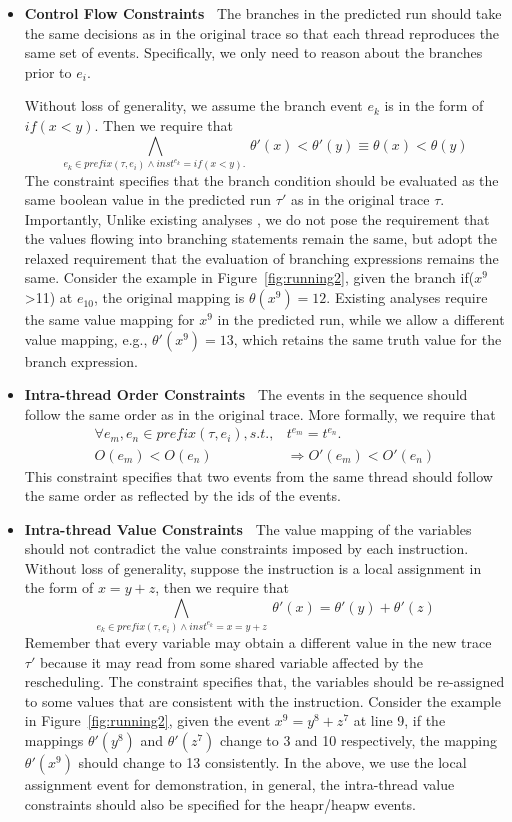 \begin{itemize}
\item {\bf Control Flow Constraints\ } The branches in the predicted run should take the same decisions as in the original trace so that each thread reproduces the same set of events.  Specifically, we only need to reason about the branches prior to $e_i$.

Without loss of generality, we assume the branch event $e_k$ is in the form of $if(x<y)$. Then  we require that 
$$
\bigwedge_{e_k \in prefix(\tau,e_i) \wedge  inst^{e_k}=if(x<y).\ }  \theta'(x)<\theta'(y) 	\equiv \theta(x)<\theta(y)
$$ 
The constraint specifies that the branch condition should be evaluated as the same boolean value in the predicted run $\tau'$ as in the original trace $\tau$.
 Importantly, Unlike existing analyses \cite{yannis,pldi14}, we do not pose the requirement that the values flowing into branching statements remain the same, but adopt the relaxed requirement that the evaluation of branching expressions remains the same. Consider the example in Figure~\ref{fig:running2}, given the branch if($x^9$>11) at $e_10$, the original mapping is $\theta(x^9)=12$. Existing analyses require the same value mapping for $x^9$  in the predicted run, while we allow  a different value mapping, e.g., $\theta'(x^9)=13$, which retains the same truth value for the branch expression.
\item {\bf Intra-thread Order Constraints\ } The events in the sequence should follow the same order as in the original trace. More formally, we require that
$$
\begin{array}{rl}
\forall e_m, e_n \in prefix(\tau,e_i), s.t., & t^{e_m} = t^{e_n}. \\
 O(e_m) < O(e_n)\  & \Rightarrow O'(e_{m}) < O'(e_{n}) 
\end{array}
$$ 
This constraint specifies that two events from the same thread should follow the same order as reflected by the ids of the events.
\item {\bf Intra-thread Value Constraints\ } The value mapping of the variables should not contradict the value constraints imposed by each instruction.   Without loss of generality, suppose the instruction is a local assignment in the form of $x=y+z$, then we require that
$$
\bigwedge_{e_k \in prefix(\tau,e_i) \wedge inst^{e_k}=x=y+z}\
	\theta'(x)=\theta'(y)+\theta'(z)
$$
Remember that every variable may obtain a different value in the new trace $\tau'$ because it may read from some shared variable affected by the rescheduling.
The constraint specifies that, the variables should be re-assigned to some values that are consistent with the instruction. Consider the example in Figure~\ref{fig:running2}, given the event $x^9=y^8+z^7$ at line 9, if the mappings $\theta'(y^8)$ and $\theta'(z^7)$ change to 3 and 10 respectively, the mapping $\theta'(x^9)$ should change to 13 consistently. In the above, we use the local assignment event for demonstration, in general, the intra-thread value constraints should also be specified for the {\sf  heapr/heapw} events.
\end{itemize}



